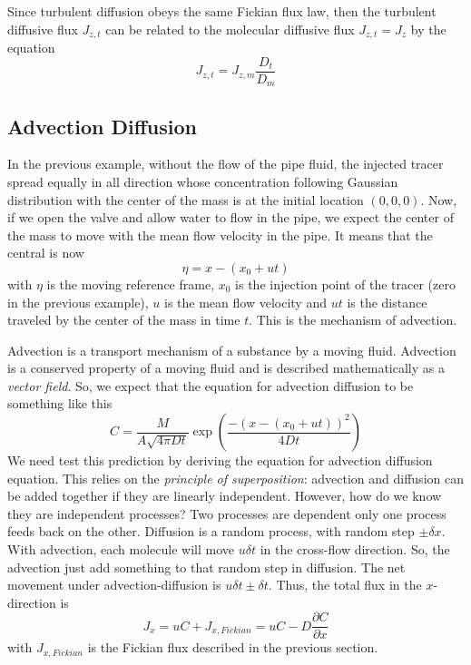 Since turbulent diffusion obeys the same Fickian flux law, then the
turbulent diffusive flux $J_{z,t}$ can be related to the molecular
diffusive flux $J_{z,t} = J_z$ by the equation
\begin{equation}
  \label{eq:186}  
  J_{z,t} = J_{z,m} \frac{D_t}{D_m}
\end{equation}
\subsection{Advection Diffusion}
\label{sec:advection}

In the previous example, without the flow of the pipe fluid, the
injected tracer spread equally in all direction whose concentration
following Gaussian distribution with the center of the mass is at the
initial location $(0,0,0)$. Now, if we open the valve and allow water
to flow in the pipe, we expect the center of the mass to move with the
mean flow velocity in the pipe. It means that the central is now
\begin{equation}
  \label{eq:195}
  \eta = x - (x_0 + ut)
\end{equation}
with $\eta$ is the moving reference frame, $x_0$ is the injection
point of the tracer (zero in the previous example), $u$ is the mean
flow velocity and $ut$ is the distance traveled by the center of the
mass in time $t$. This is the mechanism of advection.

Advection is a transport mechanism of a substance by a moving
fluid. Advection is a conserved property of a moving fluid and is
described mathematically as a {\it vector field}. So, we expect that
the equation for advection diffusion to be something like this
\begin{equation}
  \label{eq:196}
   C =  \frac{M}{A\sqrt{4\pi Dt}} \exp
   \left(\frac{-(x-(x_0+ut))^2}{4Dt} \right)
\end{equation}
We need test this prediction by deriving the equation for advection
diffusion equation. This relies on the
{\it principle of superposition}: advection and diffusion can be added
together if they are linearly independent. However, how do we know
they are independent processes? Two processes are dependent only one
process feeds back on the other. Diffusion is a random process, with
random step $\pm \delta x$. With advection, each molecule will move
$u\delta t$ in the cross-flow direction. So, the advection just add
something to that random step in diffusion. The net movement under
advection-diffusion is $u\delta t \pm \delta t$. Thus, the total flux
in the $x$-direction is
\begin{equation}
  \label{eq:197}
  J_x = uC + J_{x,Fickian} = uC - D \frac{\partial C}{\partial x}
\end{equation}
with $J_{x,Fickian}$ is the Fickian flux described in the previous
section.

